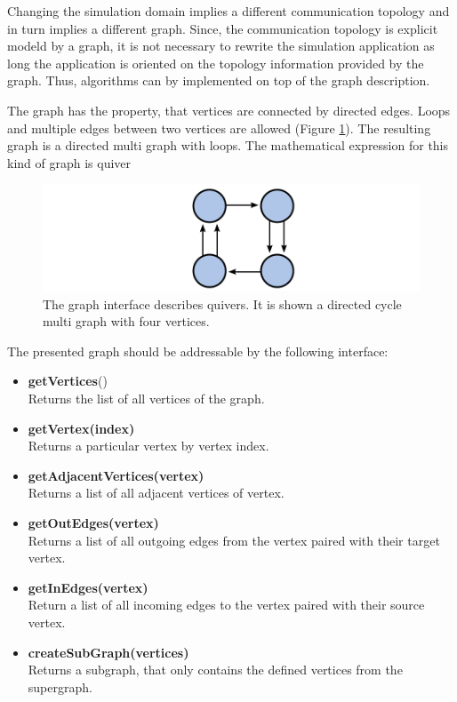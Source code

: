 Changing the simulation domain implies a different communication
topology and in turn implies a different graph.  Since, the
communication topology is explicit modeld by a graph, it is not
necessary to rewrite the simulation application as long the
application is oriented on the topology information provided by the
graph. Thus, algorithms can by implemented on top of the graph
description.

The graph has the property, that vertices are connected by directed edges. Loops
and multiple edges between two vertices are allowed (Figure
\ref{fig:graph}). The resulting graph is a directed multi graph with
loops. The mathematical expression for this kind of graph is quiver
\cite{ref:quiver}

\begin{figure}[H]
  \centering \includegraphics[width=\textwidth]{graphics/30_graph}
  \caption{The graph interface describes quivers. It is shown a directed cycle multi graph with four vertices.}
  \label{fig:graph}
\end{figure}

The presented graph should be addressable by the following interface:

\begin{itemize}
  \item \textbf{getVertices}()\\
    Returns the list of all vertices of the graph.
    
  \item  \textbf{getVertex(index)}\\
    Returns a particular vertex by vertex index.

  \item  \textbf{getAdjacentVertices(vertex)}\\
    Returns a list of all adjacent vertices of vertex.

  \item  \textbf{getOutEdges(vertex)}\\
    Returns a list of all outgoing edges from the vertex
    paired with their target vertex.

  \item  \textbf{getInEdges(vertex)}\\
    Return a list of all incoming edges to the vertex 
    paired with their source vertex.

  \item  \textbf{createSubGraph(vertices)}\\
    Returns a subgraph, that only contains the defined
    vertices from the supergraph.
\end{itemize}

